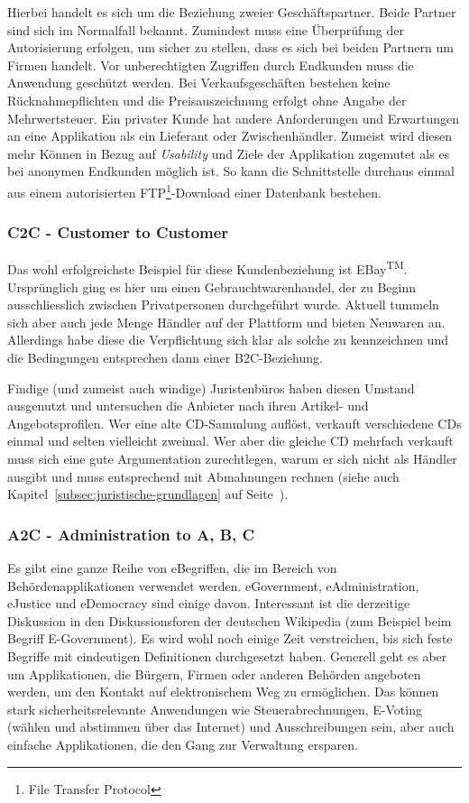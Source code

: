 Hierbei handelt es sich um die Beziehung zweier Geschäftspartner. Beide Partner
sind sich im Normalfall bekannt. Zumindest muss eine Überprüfung der Autorisierung
erfolgen, um sicher zu stellen, dass es sich bei beiden Partnern um Firmen handelt.
Vor unberechtigten Zugriffen durch Endkunden muss die Anwendung geschützt werden.
Bei Verkaufsgeschäften bestehen keine Rücknahmepflichten und die Preisauszeichnung
erfolgt ohne Angabe der Mehrwertsteuer. Ein privater Kunde hat andere Anforderungen
und Erwartungen an eine Applikation als ein Lieferant oder Zwischenhändler.
Zumeist wird diesen mehr Können in Bezug auf \emph{Usability} und Ziele der
Applikation zugemutet als es bei anonymen Endkunden möglich ist. So kann die
Schnittstelle durchaus einmal aus einem autorisierten
FTP\footnote{File Transfer Protocol}-Download einer Datenbank bestehen.

\subsubsection*{C2C - Customer to Customer}

Das wohl erfolgreichste Beispiel für diese Kundenbeziehung ist EBay\textsuperscript{TM}.
Ursprünglich ging es hier um einen Gebrauchtwarenhandel, der zu Beginn
ausschliesslich zwischen Privatpersonen durchgeführt wurde. Aktuell tummeln
sich aber auch jede Menge Händler auf der Plattform und bieten Neuwaren an.
Allerdings habe diese die Verpflichtung sich klar als solche zu kennzeichnen
und die Bedingungen entsprechen dann einer B2C-Beziehung.

Findige (und zumeist auch windige) Juristenbüros haben diesen Umstand
ausgenutzt und untersuchen die Anbieter nach ihren Artikel- und Angebotsprofilen.
Wer eine alte CD-Sammlung auflöst, verkauft verschiedene CDs einmal und selten
vielleicht zweimal. Wer aber die gleiche CD mehrfach verkauft muss sich eine
gute Argumentation zurechtlegen, warum er sich nicht als Händler ausgibt
und muss entsprechend mit Abmahnungen rechnen (siehe auch
Kapitel~\ref{subsec:juristische-grundlagen} auf Seite~\pageref{subsec:juristische-grundlagen}).

\subsubsection*{A2C - Administration to A, B, C}

Es gibt eine ganze Reihe von eBegriffen, die im Bereich von Behördenapplikationen
verwendet werden. eGovernment, eAdministration, eJustice und eDemocracy sind
einige davon. Interessant ist die derzeitige Diskussion in den Diskussionsforen
der deutschen Wikipedia (zum Beispiel beim Begriff E-Government). Es wird
wohl noch einige Zeit verstreichen, bis sich feste Begriffe mit eindeutigen
Definitionen durchgesetzt haben. Generell geht es aber um Applikationen,
die Bürgern, Firmen oder anderen Behörden angeboten werden, um den Kontakt
auf elektronischem Weg zu ermöglichen. Das können stark sicherheitsrelevante
Anwendungen wie Steuerabrechnungen, E-Voting (wählen und abstimmen über das
Internet) und Ausschreibungen sein, aber auch einfache Applikationen, die den
Gang zur Verwaltung ersparen.

